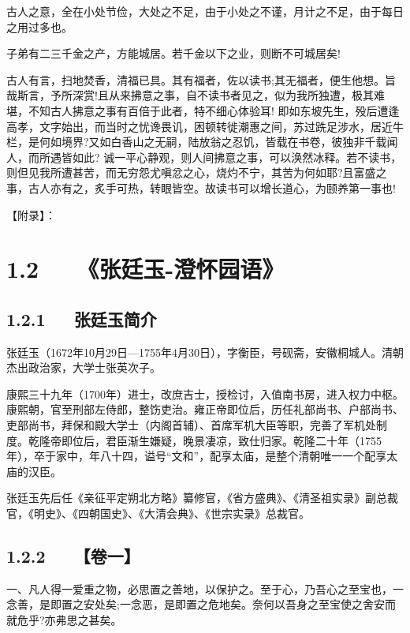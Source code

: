 \documentclass[letterpaper,10pt,english]{sphinxmanual}
\begin{document}
古人之意，全在小处节俭，大处之不足，由于小处之不谨，月计之不足，由于每日之用过多也。

子弟有二三千金之产，方能城居。若千金以下之业，则断不可城居矣!

古人有言，扫地焚香，清福已具。其有福者，佐以读书;其无福者，便生他想。旨哉斯言，予所深赏!且从来拂意之事，自不读书者见之，似为我所独遭，极其难堪，不知古人拂意之事有百倍于此者，特不细心体验耳! 即如东坡先生，殁后遭逢高孝，文字始出，而当时之忧谗畏讥，困顿转徙潮惠之间，苏过跣足涉水，居近牛栏，是何如境界?又如白香山之无嗣，陆放翁之忍饥，皆载在书卷，彼独非千载闻人，而所遇皆如此? 诚一平心静观，则人间拂意之事，可以涣然冰释。若不读书，则但见我所遭甚苦，而无穷怨尤嗔忿之心，烧灼不宁，其苦为何如耶?且富盛之事，古人亦有之，炙手可热，转眼皆空。故读书可以增长道心，为颐养第一事也!

【附录】：


\section{1.2   《张廷玉-澄怀园语》}
\label{\detokenize{p00_u5176_u5b83/_u300a_u5f20_u82f1-_u806a_u8bad_u658b_u8bed_u300b_u300a_u5f20_u5ef7_u7389-_u6f84_u6000_u56ed_u8bed_u300b_u5408_u8f91:id7}}

\subsection{1.2.1   张廷玉简介}
\label{\detokenize{p00_u5176_u5b83/_u300a_u5f20_u82f1-_u806a_u8bad_u658b_u8bed_u300b_u300a_u5f20_u5ef7_u7389-_u6f84_u6000_u56ed_u8bed_u300b_u5408_u8f91:id8}}
张廷玉（1672年10月29日—1755年4月30日），字衡臣，号砚斋，安徽桐城人。清朝杰出政治家，大学士张英次子。

康熙三十九年（1700年）进士，改庶吉士，授检讨，入值南书房，进入权力中枢。康熙朝，官至刑部左侍郎，整饬吏治。雍正帝即位后，历任礼部尚书、户部尚书、吏部尚书，拜保和殿大学士（内阁首辅）、首席军机大臣等职，完善了军机处制度。乾隆帝即位后，君臣渐生嫌疑，晚景凄凉，致仕归家。乾隆二十年（1755年），卒于家中，年八十四，谥号“文和”，配享太庙，是整个清朝唯一一个配享太庙的汉臣。

张廷玉先后任《亲征平定朔北方略》纂修官，《省方盛典》、《清圣祖实录》副总裁官，《明史》、《四朝国史》、《大清会典》、《世宗实录》总裁官。


\subsection{1.2.2   【卷一】}
\label{\detokenize{p00_u5176_u5b83/_u300a_u5f20_u82f1-_u806a_u8bad_u658b_u8bed_u300b_u300a_u5f20_u5ef7_u7389-_u6f84_u6000_u56ed_u8bed_u300b_u5408_u8f91:id9}}
一、凡人得一爱重之物，必思置之善地，以保护之。至于心，乃吾心之至宝也，一念善，是即置之安处矣;一念恶，是即置之危地矣。奈何以吾身之至宝使之舍安而就危乎?亦弗思之甚矣。
\end{document}
